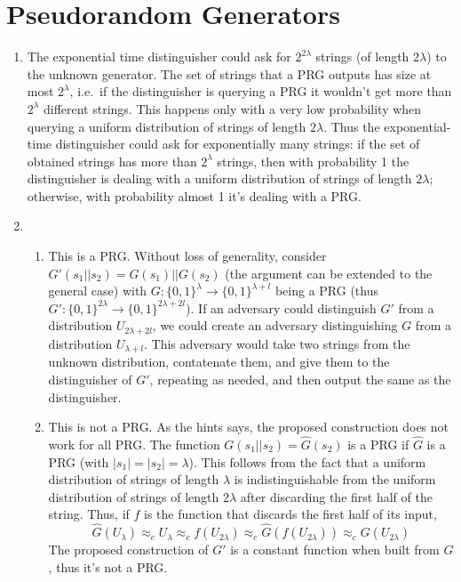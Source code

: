 \documentclass{article}
\newcommand{\compind}{\approx_c}
\newcommand{\abs}[1]{\left| {#1} \right|}
\begin{document}
\section{Pseudorandom Generators}

\begin{enumerate}
	\item The exponential time distinguisher could ask for $2^{2\lambda}$ strings (of length $2\lambda$) to the unknown generator.
		The set of strings that a PRG outputs has size at most $2^{\lambda}$, i.e.\ if the distinguisher is querying a PRG it wouldn't get more than $2^{\lambda}$ different strings.
		This happens only with a very low probability when querying a uniform distribution of strings of length $2\lambda$.
		Thus the exponential-time distinguisher could ask for exponentially many strings: if the set of obtained strings has more than $2^{\lambda}$ strings, then with probability 1 the distinguisher is dealing with a uniform distribution of strings of length $2\lambda$; otherwise, with probability almost 1 it's dealing with a PRG.

	\item
		\begin{enumerate}
			\item This is a PRG.
				Without loss of generality, consider $G'(s_1 || s_2) = G(s_1) || G(s_2)$ (the argument can be extended to the general case) with $G : \{0,1\}^{\lambda} \to \{0,1\}^{\lambda + l}$ being a PRG (thus $G' : \{0,1\}^{2\lambda} \to \{0,1\}^{2\lambda + 2l}$).
				If an adversary could distinguish $G'$ from a distribution $U_{2\lambda + 2l}$, we could create an adversary distinguishing $G$ from a distribution $U_{\lambda + l}$.
				This adversary would take two strings from the unknown distribution, contatenate them, and give them to the distinguisher of $G'$, repeating as needed, and then output the same as the distinguisher.
			\item This is not a PRG.
				As the hints says, the proposed construction does not work for all PRG.
				The function $G(s_1 || s_2) = \hat{G}(s_2)$ is a PRG if $\hat{G}$ is a PRG (with $\abs{s_1} = \abs{s_2} = \lambda$).
				This follows from the fact that a uniform distribution of strings of length $\lambda$ is indistinguishable from the uniform distribution of strings of length $2\lambda$ after discarding the first half of the string.
				Thus, if $f$ is the function that discards the first half of its input,
				\[
					\hat{G}(U_{\lambda}) \compind U_{\lambda} \compind f(U_{2\lambda}) \compind \hat{G}(f(U_{2\lambda})) \compind G(U_{2\lambda})
				\]
				The proposed construction of $G'$ is a constant function when built from $G$, thus it's not a PRG.
		\end{enumerate}
\end{enumerate}
\end{document}
